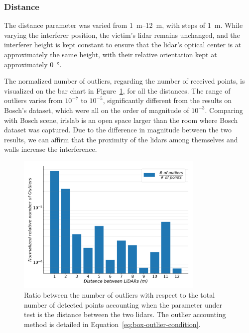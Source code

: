 \subsubsection{Distance}
The distance parameter was varied from \SIrange{1}{12}{\meter}, with steps of \SI{1}{\meter}. While varying the interferer position, the victim's \ac{lidar} remains unchanged, and the interferer height is kept constant to ensure that the \ac{lidar}'s optical center is at approximately the same height, with their relative orientation kept at approximately \SI{0}{\degree}.

The normalized number of outliers, regarding the number of received points, is visualized on the bar chart in Figure~\ref{fig:box-filter-outliers-distance}, for all the distances. The range of outliers varies from $10^{-7}$ to $10^{-5}$, significantly different from the results on Bosch's dataset, which were all on the order of magnitude of $10^{-3}$. Comparing with Bosch scene, \ac{irislab} is an open space larger than the room where Bosch dataset was captured. Due to the difference in magnitude between the two results, we can affirm that the proximity of the \acp{lidar} among themselves and walls increase the interference. 

\begin{figure}[!ht]
\centering
\includegraphics[width=0.8\textwidth]{img/lidar-interference/box-filtering/interference-box-filter-outliers-distance.png}
\caption[Relative number of outliers when the distance between the \acp{lidar} is varied on \ac{irislab}.]{Ratio between the number of outliers with respect to the total number of detected points accounting when the parameter under test is the distance between the two \acp{lidar}. The outlier accounting method is detailed in Equation~\eqref{eq:box-outlier-condition}.}
\label{fig:box-filter-outliers-distance}
\end{figure}

